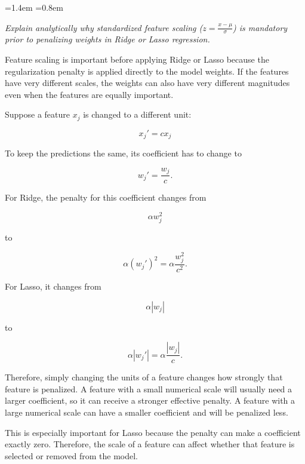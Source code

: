 \documentclass[12pt,a4paper]{article}
\newcommand{\qtext}[1]{%
  \begin{list}{}{\leftmargin=1.4em \rightmargin=0.8em
                 \topsep=3pt \parsep=0pt \itemsep=0pt}
  \item[]\itshape #1
  \end{list}}
\begin{document}
\qtext{Explain analytically why standardized feature scaling ($z = \frac{x-\mu}{\sigma}$) is
mandatory prior to penalizing weights in Ridge or Lasso regression.}

Feature scaling is important before applying Ridge or Lasso because the regularization penalty is
applied directly to the model weights. If the features have very different scales, the weights can
also have very different magnitudes even when the features are equally important.

Suppose a feature $x_j$ is changed to a different unit:

\begin{equation*}
x_j' = c x_j
\end{equation*}

To keep the predictions the same, its coefficient has to change to

\begin{equation}
w_j' = \frac{w_j}{c}.
\label{eq:rescale}
\end{equation}

For Ridge, the penalty for this coefficient changes from

\begin{equation*}
\alpha w_j^2
\end{equation*}

to

\begin{equation*}
\alpha (w_j')^2 = \alpha\frac{w_j^2}{c^2}.
\end{equation*}

For Lasso, it changes from

\begin{equation*}
\alpha |w_j|
\end{equation*}

to

\begin{equation*}
\alpha |w_j'| = \alpha\frac{|w_j|}{c}.
\end{equation*}

Therefore, simply changing the units of a feature changes how strongly that feature is penalized.
A feature with a small numerical scale will usually need a larger coefficient, so it can receive a
stronger effective penalty. A feature with a large numerical scale can have a smaller coefficient
and will be penalized less.

This is especially important for Lasso because the penalty can make a coefficient exactly zero.
Therefore, the scale of a feature can affect whether that feature is selected or removed from the
model.
\end{document}
